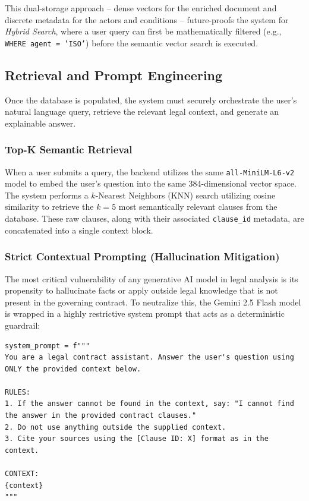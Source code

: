 \documentclass[twoside,final]{hcmut-report}
\begin{document}
This dual-storage approach -- dense vectors for the enriched document and discrete metadata for the actors and conditions -- future-proofs the system for \emph{Hybrid Search}, where a user query can first be mathematically filtered (e.g., \texttt{WHERE agent = 'ISO'}) before the semantic vector search is executed.

\subsection{Retrieval and Prompt Engineering}
\label{sec:retrieval_prompt_engineering}

Once the database is populated, the system must securely orchestrate the user's natural language query, retrieve the relevant legal context, and generate an explainable answer.

\subsubsection{Top-K Semantic Retrieval}
When a user submits a query, the backend utilizes the same \texttt{all-MiniLM-L6-v2} model to embed the user's question into the same 384-dimensional vector space. The system performs a $k$-Nearest Neighbors (KNN) search utilizing cosine similarity to retrieve the $k=5$ most semantically relevant clauses from the database. These raw clauses, along with their associated \texttt{clause\_id} metadata, are concatenated into a single context block.

\subsubsection{Strict Contextual Prompting (Hallucination Mitigation)}
The most critical vulnerability of any generative AI model in legal analysis is its propensity to hallucinate facts or apply outside legal knowledge that is not present in the governing contract. To neutralize this, the Gemini 2.5 Flash model is wrapped in a highly restrictive system prompt that acts as a deterministic guardrail:

\begin{verbatim}
system_prompt = f"""
You are a legal contract assistant. Answer the user's question using ONLY the provided context below.

RULES:
1. If the answer cannot be found in the context, say: "I cannot find the answer in the provided contract clauses."
2. Do not use anything outside the supplied context.
3. Cite your sources using the [Clause ID: X] format as in the context.

CONTEXT:
{context}
"""
\end{verbatim}
\end{document}
